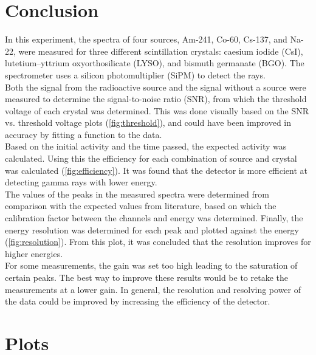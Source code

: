 \documentclass[a4paper, 11pt, table]{article}
\begin{document}
\section{Conclusion}
In this experiment, the spectra of four sources, Am-241, Co-60, Cs-137, and Na-22, were measured for three different scintillation crystals: caesium iodide (CsI), lutetium–yttrium oxyorthosilicate (LYSO), and bismuth germanate (BGO). The spectrometer uses a silicon photomultiplier (SiPM) to detect the rays.\\

Both the signal from the radioactive source and the signal without a source were measured to determine the signal-to-noise ratio (SNR), from which the threshold voltage of each crystal was determined. This was done visually based on the SNR vs. threshold voltage plots (\cref{fig:threshold}), and could have been improved in accuracy by fitting a function to the data. \\

Based on the initial activity and the time passed, the expected activity was calculated. Using this the efficiency for each combination of source and crystal was calculated (\cref{fig:efficiency}). It was found that the detector is more efficient at detecting gamma rays with lower energy.\\

The values of the peaks in the measured spectra were determined from comparison with the expected values from literature, based on which the calibration factor between the channels and energy was determined. Finally, the energy resolution was determined for each peak and plotted against the energy (\cref{fig:resolution}). From this plot, it was concluded that the resolution improves for higher energies.\\

For some measurements, the gain was set too high leading to the saturation of certain peaks. The best way to improve these results would be to retake the measurements at a lower gain. In general, the resolution and resolving power of the data could be improved by increasing the efficiency of the detector.


\printbibliography
\appendix
\section{Plots} \label{app: data analysis}
\end{document}
